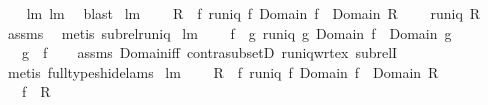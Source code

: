 \begin{isabellebody}
%
\isadelimproof
\ \ %
\endisadelimproof
%
\isatagproof
{}\isamarkupfalse%
\ lm{}{}{}\ lm{}{}{}\ \isamarkupfalse%
\ blast%
\endisatagproof
{\isafoldproof}%
%
\isadelimproof
\isanewline
%
\endisadelimproof
\isanewline
{}\isamarkupfalse%
\ lm{}{}{}{\isacharcolon}\ \isanewline
\ \ \ {\isachardoublequoteopen}R\ {\isasymsubseteq}\ f{\isachardoublequoteclose}\ {\isachardoublequoteopen}runiq\ f{\isachardoublequoteclose}\ {\isachardoublequoteopen}Domain\ f\ {\isacharequal}\ Domain\ R{\isachardoublequoteclose}\ \isanewline
\ \ \ {\isachardoublequoteopen}runiq\ R{\isachardoublequoteclose}\isanewline
%
\isadelimproof
\ \ %
\endisadelimproof
%
\isatagproof
{}\isamarkupfalse%
\ assms\ \isamarkupfalse%
\ {\isacharparenleft}metis\ subrel{\isacharunderscore}runiq{\isacharparenright}%
\endisatagproof
{\isafoldproof}%
%
\isadelimproof
\isanewline
%
\endisadelimproof
\isanewline
{}\isamarkupfalse%
\ lm{}{}{}{\isacharcolon}\ \isanewline
\ \ \ {\isachardoublequoteopen}f\ {\isasymsubseteq}\ g{\isachardoublequoteclose}\ {\isachardoublequoteopen}runiq\ g{\isachardoublequoteclose}\ {\isachardoublequoteopen}Domain\ f\ {\isacharequal}\ Domain\ g{\isachardoublequoteclose}\ \isanewline
\ \ \ {\isachardoublequoteopen}g\ {\isasymsubseteq}\ f{\isachardoublequoteclose}\isanewline
%
\isadelimproof
\ \ %
\endisadelimproof
%
\isatagproof
{}\isamarkupfalse%
\ assms\ Domain{\isacharunderscore}iff\ contra{\isacharunderscore}subsetD\ runiq{\isacharunderscore}wrt{\isacharunderscore}ex{}\ subrelI\isanewline
\ \ \isamarkupfalse%
\ {\isacharparenleft}metis\ {\isacharparenleft}full{\isacharunderscore}types{\isacharcomma}hide{\isacharunderscore}lams{\isacharparenright}{\isacharparenright}%
\endisatagproof
{\isafoldproof}%
%
\isadelimproof
\isanewline
%
\endisadelimproof
\isanewline
{}\isamarkupfalse%
\ lm{}{}{}{\isacharcolon}\ \isanewline
\ \ \ {\isachardoublequoteopen}R\ {\isasymsubseteq}\ f{\isachardoublequoteclose}\ {\isachardoublequoteopen}runiq\ f{\isachardoublequoteclose}\ {\isachardoublequoteopen}Domain\ f\ {\isasymsubseteq}\ Domain\ R{\isachardoublequoteclose}\ \isanewline
\ \ \ {\isachardoublequoteopen}f\ {\isacharequal}\ R{\isachardoublequoteclose}\ \isanewline

\end{isabellebody}
